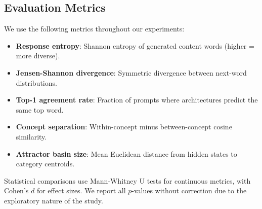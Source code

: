 \subsection{Evaluation Metrics}

We use the following metrics throughout our experiments:
\begin{itemize}[leftmargin=*,itemsep=0pt,topsep=0pt]
    \item \textbf{Response entropy}: Shannon entropy of generated content words (higher = more diverse).
    \item \textbf{Jensen-Shannon divergence}: Symmetric divergence between next-word distributions.
    \item \textbf{Top-1 agreement rate}: Fraction of prompts where architectures predict the same top word.
    \item \textbf{Concept separation}: Within-concept minus between-concept cosine similarity.
    \item \textbf{Attractor basin size}: Mean Euclidean distance from hidden states to category centroids.
\end{itemize}

Statistical comparisons use Mann-Whitney U tests for continuous metrics, with Cohen's $d$ for effect sizes. We report all $p$-values without correction due to the exploratory nature of the study.
